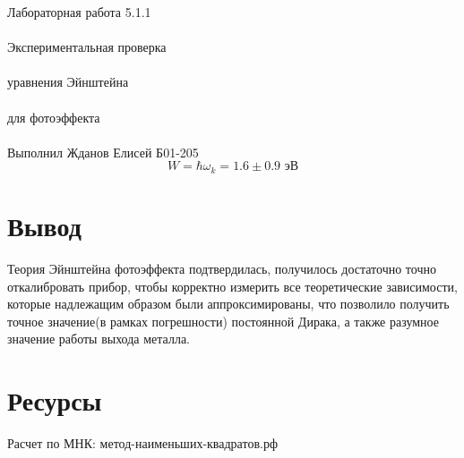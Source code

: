 \documentclass{astroedu-lab}
\begin{document}
\begin{problem}{\huge Лабораторная работа 5.1.1\\\\Экспериментальная проверка\\\\ уравнения Эйнштейна\\\\
для фотоэффекта\\\\Выполнил Жданов Елисей Б01-205}
\begin{equation}
	W = \hbar \omega_k = 1.6 \pm 0.9 \text{ эВ}
\end{equation}



\section{Вывод}

Теория Эйнштейна фотоэффекта подтвердилась, получилось достаточно точно откалибровать прибор, чтобы корректно измерить все теоретические зависимости, которые надлежащим образом были аппроксимированы, что позволило получить точное значение(в рамках погрешности) постоянной Дирака, а также разумное значение работы выхода металла.

\section{Ресурсы}

Расчет по МНК: метод-наименьших-квадратов.рф


\end{problem}
\end{document}
